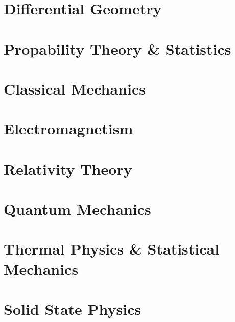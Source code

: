 \documentclass[12pt]{report}
\begin{document}
\part{Differential Geometry}









\part{Propability Theory \& Statistics}




\part{Classical Mechanics}



%
%
%

\part{Electromagnetism}




\part{Relativity Theory}


\part{Quantum Mechanics}









\part{Thermal Physics \& Statistical Mechanics}%
%
%
%

\part{Solid State Physics}%
%
\end{document}
